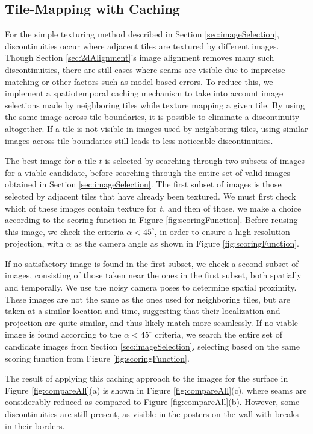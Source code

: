 \documentclass[]{spie}  %
\begin{document}
\subsection{Tile-Mapping with Caching}
\label{sec:mappingWithCaching}
For the simple texturing method described in Section
\ref{sec:imageSelection}, discontinuities occur where adjacent tiles
are textured by different images. Though Section
\ref{sec:2dAlignment}'s image alignment removes many such
discontinuities, there are still cases where seams are visible due to
imprecise matching or other factors such as model-based errors. To
reduce this, we implement a spatiotemporal caching mechanism to take
into account image selections made by neighboring tiles while texture
mapping a given tile. By using the same image across tile boundaries,
it is possible to eliminate a discontinuity altogether. If a tile is
not visible in images used by neighboring tiles, using similar images
across tile boundaries still leads to less noticeable discontinuities.

The best image for a tile $t$ is selected by searching through two
subsets of images for a viable candidate, before searching through the
entire set of valid images obtained in Section
\ref{sec:imageSelection}. The first subset of images is those selected
by adjacent tiles that have already been textured. We must first check
which of these images contain texture for $t$, and then of those, we
make a choice according to the scoring function in Figure
\ref{fig:scoringFunction}. Before reusing this image, we check the
criteria $\alpha < 45^\circ$, in order to ensure a high resolution
projection, with $\alpha$ as the camera angle as shown in Figure
\ref{fig:scoringFunction}.

If no satisfactory image is found in the first subset, we check a
second subset of images, consisting of those taken near the ones in
the first subset, both spatially and temporally. We use the noisy
camera poses to determine spatial proximity. These images are not the
same as the ones used for neighboring tiles, but are taken at a
similar location and time, suggesting that their localization and
projection are quite similar, and thus likely match more
seamlessly. If no viable image is found according to the $\alpha <
45^\circ$ criteria, we search the entire set of candidate images from
Section \ref{sec:imageSelection}, selecting based on the same scoring
function from Figure \ref{fig:scoringFunction}.

The result of applying this caching approach to the images for the
surface in Figure \ref{fig:compareAll}(a) is shown in Figure
\ref{fig:compareAll}(c), where seams are considerably reduced as
compared to Figure \ref{fig:compareAll}(b). However, some
discontinuities are still present, as visible in the posters on the
wall with breaks in their borders.
\end{document}
